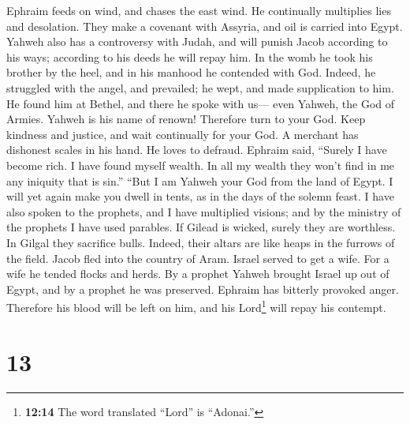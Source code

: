  Ephraim feeds on wind, and chases the east wind. He
continually multiplies lies and desolation. They make a covenant with
Assyria, and oil is carried into Egypt.  Yahweh also has a
controversy with Judah, and will punish Jacob according to his ways;
according to his deeds he will repay him.  In the womb he
took his brother by the heel, and in his manhood he contended with God.
 Indeed, he struggled with the angel, and prevailed; he
wept, and made supplication to him. He found him at Bethel, and there he
spoke with us---  even Yahweh, the God of Armies. Yahweh
is his name of renown!  Therefore turn to your God. Keep
kindness and justice, and wait continually for your God. 
A merchant has dishonest scales in his hand. He loves to defraud.
 Ephraim said, ``Surely I have become rich. I have found
myself wealth. In all my wealth they won't find in me any iniquity that
is sin.''  ``But I am Yahweh your God from the land of
Egypt. I will yet again make you dwell in tents, as in the days of the
solemn feast.  I have also spoken to the prophets, and I
have multiplied visions; and by the ministry of the prophets I have used
parables.  If Gilead is wicked, surely they are
worthless. In Gilgal they sacrifice bulls. Indeed, their altars are like
heaps in the furrows of the field.  Jacob fled into the
country of Aram. Israel served to get a wife. For a wife he tended
flocks and herds.  By a prophet Yahweh brought Israel up
out of Egypt, and by a prophet he was preserved.  Ephraim
has bitterly provoked anger. Therefore his blood will be left on him,
and his Lord\footnote{\textbf{12:14} The word translated ``Lord'' is
  ``Adonai.''} will repay his contempt.

\hypertarget{section-12}{%
\section{13}\label{section-12}}

